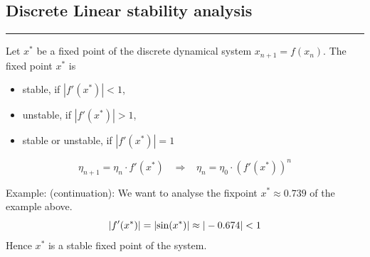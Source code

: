 \subsection{Discrete Linear stability analysis}
\noindent\rule[\linienAbstand]{\linewidth}{\linienDicke}
Let $x^*$ be a fixed point of the discrete dynamical system $x_{n+1} = f(x_n)$. The fixed point $x^*$ is
\begin{itemize}
  \item stable, if $|f'(x^*)| < 1$,
  \item unstable, if $|f'(x^*)| > 1$,
  \item stable or unstable, if  $|f'(x^*)| = 1$
\end{itemize}

\begin{equation}
  \eta_{n+1} = \eta_n \cdot f'(x^*) \;\;\; \Rightarrow \;\;\;
  \eta_n = \eta_0 \cdot \left(f'(x^*)\right)^n
\end{equation}

Example: (continuation): We want to analyse the fixpoint $x^* \approx 0.739$ of the example above.
\begin{equation}
  |f'(x^*)| = |\textup{sin}(x^*)| \approx |-0.674| < 1
\end{equation}
Hence $x^*$ is a stable fixed point of the system.
